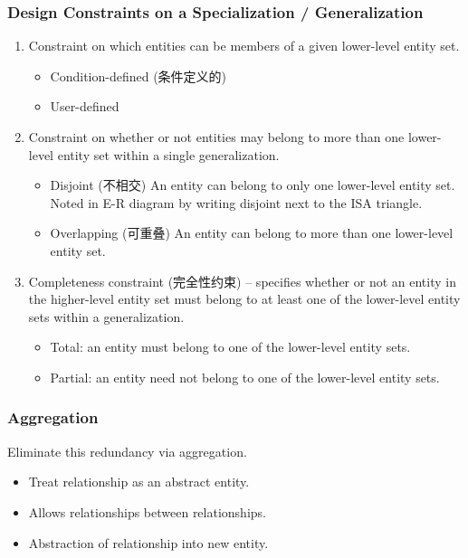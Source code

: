 \subsubsection{Design Constraints on a Specialization / Generalization}
\begin{enumerate}
    \item Constraint on which entities can be members of a given lower-level entity set.
    \begin{itemize}\small
        \item Condition-defined (条件定义的)
        \item User-defined
    \end{itemize}
    
    \item Constraint on whether or not entities may belong to more than one lower-level entity set within a single generalization.
    \begin{itemize}\small
        \item Disjoint (不相交)
        \subitem An entity can belong to only one lower-level entity set.
        \subitem Noted in E-R diagram by writing disjoint next to the ISA triangle.
        \item  Overlapping (可重叠)
        \subitem An entity can belong to more than one lower-level entity set.
    \end{itemize}
    
    \item Completeness constraint (完全性约束) -- specifies whether or not an entity in the higher-level entity set must belong to at least one of the lower-level entity sets within a generalization.
    \begin{itemize}\small
        \item Total: an entity must belong to one of the lower-level entity sets.
        \item Partial: an entity need not belong to one of the lower-level entity sets.
    \end{itemize}
\end{enumerate}

\subsubsection{Aggregation}
Eliminate this redundancy via aggregation.
\begin{itemize}\small
    \item Treat relationship as an abstract entity.
    \item Allows relationships between relationships.
    \item Abstraction of relationship into new entity.
\end{itemize}

